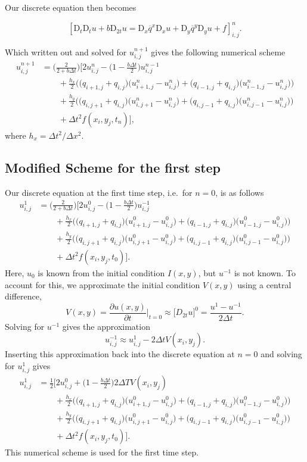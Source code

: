 \documentclass[a4paper, 11pt, notitlepage, english]{article}
\newcommand{\p}{\partial}
\newcommand{\D}{\mbox{D}}
\begin{document}
Our discrete equation then becomes

$$[\D_t\D_t u + b\D_{2t}u = \D_x \overline{q}^{x}\D_x u + \D_y \overline{q}^y \D_y u + f]^{n}_{i,j}.$$

Which written out and solved for $u_{i,j}^{n+1}$ gives the following numerical scheme
\begin{align*}
u_{i,j}^{n+1} &= \bigg(\frac{2}{2+b\Delta t}\bigg)\Bigg[2u_{i,j}^n - \bigg(1-\frac{b\Delta t}{2}\bigg)u_{i,j}^{n-1} \\ 
&\qquad + \frac{h_x}{2}\bigg(\big(q_{i+1,j}+q_{i,j}\big)\big(u_{i+1,j}^n-u_{i,j}^n\big) + \big(q_{i-1,j} + q_{i,j}\big)\big(u_{i-1,j}^n-u_{i,j}^n\big)\bigg) \\
&\qquad + \frac{h_y}{2}\bigg(\big(q_{i,j+1}+q_{i,j}\big)\big(u_{i,j+1}^n-u_{i,j}^n\big) + \big(q_{i,j-1} + q_{i,j}\big)\big(u_{i,j-1}^n-u_{i,j}^n\big)\bigg) \\
&\qquad + \Delta t^2 f(x_i, y_j, t_n) \bigg],
\end{align*}
where $h_x = \Delta t^2/\Delta x^2$.

\subsection*{Modified Scheme for the first step}
Our discrete equation at the first time step, i.e.\ for $n=0$, is as follows
\begin{align*}
u_{i,j}^{1} &= \bigg(\frac{2}{2+b\Delta t}\bigg)\Bigg[2u_{i,j}^0 - \bigg(1-\frac{b\Delta t}{2}\bigg)u_{i,j}^{-1} \\ 
&\qquad + \frac{h_x}{2}\bigg(\big(q_{i+1,j}+q_{i,j}\big)\big(u_{i+1,j}^0-u_{i,j}^0\big) + \big(q_{i-1,j} + q_{i,j}\big)\big(u_{i-1,j}^0-u_{i,j}^0\big)\bigg) \\
&\qquad + \frac{h_y}{2}\bigg(\big(q_{i,j+1}+q_{i,j}\big)\big(u_{i,j+1}^0-u_{i,j}^0\big) + \big(q_{i,j-1} + q_{i,j}\big)\big(u_{i,j-1}^0-u_{i,j}^0\big)\bigg) \\
&\qquad + \Delta t^2 f(x_i, y_j, t_0) \bigg].
\end{align*}
Here, $u_0$ is known from the initial condition $I(x,y)$, but $u^{-1}$ is not known. To account for this, we approximate the initial condition $V(x,y)$ using a central difference,
$$V(x,y) = \frac{\p u(x,y)}{\p t}\bigg|_{t=0} \approx \big[D_{2t} u\big]^0 = \frac{u^1 - u^{-1}}{2\Delta t}.$$
Solving for $u^{-1}$ gives the approximation
$$u_{i,j}^{-1} \approx u_{i,j}^1 - 2\Delta t V(x_i,y_j).$$
Inserting this approximation back into the discrete equation at $n=0$ and solving for $u_{i,j}^1$ gives
\begin{align*}
u_{i,j}^{1} &= \frac{1}{2}\bigg[2u_{i,j}^0 + \bigg(1-\frac{b\Delta t}{2}\bigg)2\Delta T V(x_i, y_j) \\ 
&\qquad + \frac{h_x}{2}\bigg(\big(q_{i+1,j}+q_{i,j}\big)\big(u_{i+1,j}^0-u_{i,j}^0\big) + \big(q_{i-1,j} + q_{i,j}\big)\big(u_{i-1,j}^0-u_{i,j}^0\big)\bigg) \\
&\qquad + \frac{h_y}{2}\bigg(\big(q_{i,j+1}+q_{i,j}\big)\big(u_{i,j+1}^0-u_{i,j}^0\big) + \big(q_{i,j-1} + q_{i,j}\big)\big(u_{i,j-1}^0-u_{i,j}^0\big)\bigg) \\
&\qquad + \Delta t^2 f(x_i, y_j, t_0) \bigg].
\end{align*}
This numerical scheme is used for the first time step.
\end{document}
